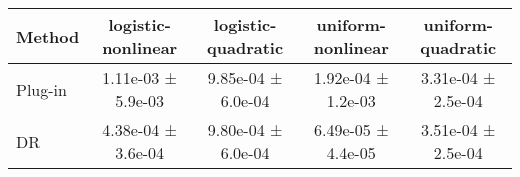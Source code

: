 \begin{tabular}{lcccc}
\toprule
Method & logistic-nonlinear & logistic-quadratic & uniform-nonlinear & uniform-quadratic \\
\midrule
Plug-in & 1.11e-03 ± 5.9e-03 & 9.85e-04 ± 6.0e-04 & 1.92e-04 ± 1.2e-03 & 3.31e-04 ± 2.5e-04 \\
DR & 4.38e-04 ± 3.6e-04 & 9.80e-04 ± 6.0e-04 & 6.49e-05 ± 4.4e-05 & 3.51e-04 ± 2.5e-04 \\
\bottomrule
\end{tabular}
